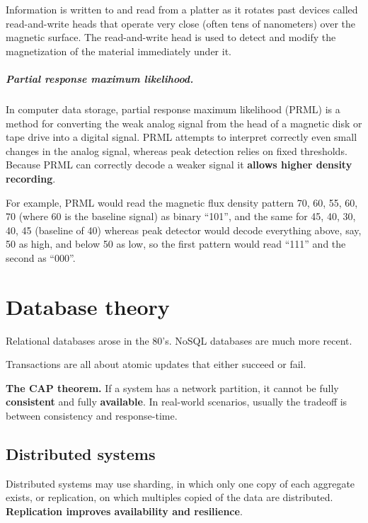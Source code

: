 \documentclass[oneside]{book} %
\theoremstyle{plain}
\begin{document}
Information is written to and read from a platter as it rotates past devices
called read-and-write heads that operate very close (often tens of nanometers)
over the magnetic surface. The read-and-write head is used to detect and modify
the magnetization of the material immediately under it.

\paragraph{Partial response maximum likelihood.} In computer data storage,
partial response maximum likelihood (PRML) is a method for converting the weak
analog signal from the head of a magnetic disk or tape drive into a digital
signal. PRML attempts to interpret correctly even small changes in the analog
signal, whereas peak detection relies on fixed thresholds. Because PRML can
correctly decode a weaker signal it \textbf{allows higher density recording}.

For example, PRML would read the magnetic flux density pattern 70, 60, 55, 60,
70 (where 60 is the baseline signal) as binary ``101'', and the same for 45, 40,
30, 40, 45 (baseline of 40) whereas peak detector would decode everything
above, say, 50 as high, and below 50 as low, so the first pattern would read
``111'' and the second as ``000''.


\chapter{Database theory}
Relational databases arose in the 80's. NoSQL databases are much more recent.

Transactions are all about atomic updates that either succeed or fail.

\textbf{The CAP theorem.} If a system has a network partition, it cannot be
fully \textbf{consistent} and fully \textbf{available}. In real-world scenarios,
usually the tradeoff is between consistency and response-time.

\section{Distributed systems}
Distributed systems may use sharding, in which only one copy of each aggregate
exists, or replication, on which multiples copied of the data are distributed.
\textbf{Replication improves availability and resilience}.
\end{document}
